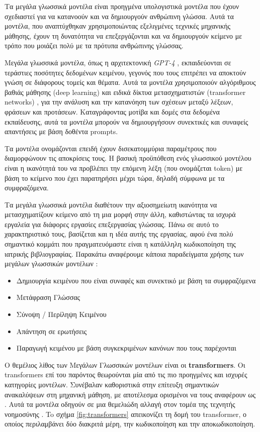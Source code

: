 \documentclass[12pt]{extarticle}
\begin{document}
Τα μεγάλα γλωσσικά μοντέλα \cite{zhao2023survey} είναι προηγμένα υπολογιστικά μοντέλα που έχουν σχεδιαστεί για να κατανοούν και να δημιουργούν ανθρώπινη γλώσσα. Αυτά τα μοντέλα, που αναπτύχθηκαν χρησιμοποιώντας εξελιγμένες τεχνικές μηχανικής μάθησης, έχουν τη δυνατότητα να επεξεργάζονται και να δημιουργούν κείμενο με τρόπο που μοιάζει πολύ με τα πρότυπα ανθρώπινης γλώσσας.

Μεγάλα γλωσσικά μοντέλα, όπως η αρχιτεκτονική \textit{GPT-4} \cite{openai2023gpt4}, εκπαιδεύονται σε τεράστιες ποσότητες δεδομένων κειμένου, γεγονός που τους επιτρέπει να αποκτούν γνώση σε διάφορους τομείς και θέματα. Αυτά τα μοντέλα χρησιμοποιούν αλγόριθμους βαθιάς μάθησης (deep learning) \cite{Sarker2021} και ειδικά δίκτυα μετασχηματιστών (transformer networks) \cite{Dosovitskiy2020}, για την ανάλυση και την κατανόηση των σχέσεων μεταξύ λέξεων, φράσεων και προτάσεων. Καταγράφοντας μοτίβα και δομές στα δεδομένα εκπαίδευσης, αυτά τα μοντέλα μπορούν να δημιουργήσουν συνεκτικές και συναφείς
απαντήσεις με βάση δοθέντα prompts.

Tα μοντέλα ονομάζονται  επειδή έχουν δισεκατομμύρια παραμέτρους που διαμορφώνουν τις αποκρίσεις τους. Η βασική προϋπόθεση ενός γλωσσικού μοντέλου είναι η ικανότητά του να προβλέπει την επόμενη λέξη (που ονομάζεται token) με βάση το κείμενο που έχει παρατηρήσει μέχρι τώρα, δηλαδή σύμφωνα με τα συμφραζόμενα.


Τα μεγάλα γλωσσικά μοντέλα διαθέτουν την αξιοσημείωτη ικανότητα να μετασχηματίζουν κείμενο από τη μια μορφή στην άλλη, καθιστώντας τα ισχυρά εργαλεία για διάφορες εργασίες επεξεργασίας γλώσσας. 
Πάνω σε αυτό το χαρακτηριστικό τους, βασίζεται και η ιδέα αυτής της εργασίας, αφού ένα πολύ σημαντικό κομμάτι που πραγματευόμαστε είναι η κατάλληλη κωδικοποίηση της ιατρικής βιβλιογραφίας.
Παρακάτω αναφέρουμε κάποια παραδείγματα χρήσης των μεγάλων γλωσσικών μοντέλων \cite{Paranjape2023}: 

\begin{itemize}
    \item Δημιουργία κειμένου που είναι συναφές και συνεκτικό με βάση τα συμφραζόμενα
    \item Μετάφραση Γλώσσας
    \item Σύνοψη / Περίληψη Κειμένου
    \item  Απάντηση σε ερωτήσεις
    \item Παραγωγή κειμένου με βάση συγκεκριμένων κανόνων που τους παρέχονται
\end{itemize}

Ο θεμέλιος λίθος των Μεγάλων Γλωσσικών μοντέλων είναι οι \textbf{transformers}.
Οι transformers \cite{Vaswani2017} επί του παρόντος θεωρούνται μία από τις πιο προηγμένες και ισχυρές κατηγορίες μοντέλων. Συνέβαλαν καθοριστικά στην επίτευξη σημαντικών ανακαλύψεων στη μηχανική μάθηση, με αποτέλεσμα ορισμένοι να τους αναφέρουν ως . Aυτά τα μοντέλα οδηγούν σε μια θεμελιώδη αλλαγή στον τομέα της τεχνητής νοημοσύνης \cite{Bommasani2021}.
To σχήμα \ref{fig:transformers} απεικονίζει τη δομή του transformer, ο οποίος περιλαμβάνει δύο διακριτά μέρη, την κωδικοποίηση και την αποκωδικοποίηση.
\end{document}
